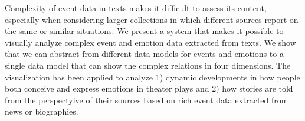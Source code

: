 Complexity of event data in texts makes it difficult to assess its content, especially when considering larger collections in which different sources report on the same or similar situations. We present a system that makes it possible to visually analyze complex event and emotion data extracted from texts. We show that we can abstract from different data models for events and emotions to a single data model that can show the complex relations in four dimensions. The visualization has been applied to analyze 1) dynamic developments in how people both conceive and express emotions in theater plays and 2) how stories are told from the perspectyive of their sources based on rich event data extracted from news or biographies.
